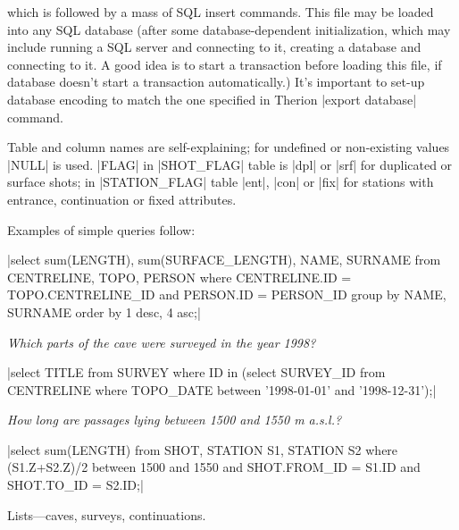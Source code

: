 which is followed by a mass of SQL insert commands. This file may be loaded 
into any SQL database (after some database-dependent initialization, which may 
include running a SQL server and connecting to it, creating a database and 
connecting to it. A good idea is to start a transaction before loading this 
file, if database doesn't start a transaction automatically.) 
It's important to set-up database encoding to match the one 
specified in Therion |export database| command.


\midinsert
    \centerline{}%
\endinsert


Table and column names are self-explaining; for undefined or non-existing 
values |NULL| is used. |FLAG| in |SHOT_FLAG| table is |dpl| or |srf| for duplicated
or surface shots; in |STATION_FLAG| table |ent|, |con| or |fix| for stations
with entrance, continuation or fixed attributes.

Examples of simple queries follow:


|select sum(LENGTH), sum(SURFACE_LENGTH), NAME, SURNAME 
  from CENTRELINE, TOPO, PERSON 
  where CENTRELINE.ID = TOPO.CENTRELINE_ID and PERSON.ID = PERSON_ID 
  group by NAME, SURNAME order by 1 desc, 4 asc;|

{\it Which parts of the cave were surveyed in the year 1998?}

|select TITLE from SURVEY where ID in 
  (select SURVEY_ID from CENTRELINE 
  where TOPO_DATE between '1998-01-01' and '1998-12-31');|

{\it How long are passages lying between 1500 and 1550 m a.s.l.?}

|select sum(LENGTH) from SHOT, STATION S1, STATION S2 
  where (S1.Z+S2.Z)/2 between 1500 and 1550 and 
  SHOT.FROM_ID = S1.ID and SHOT.TO_ID = S2.ID;|

\subsubchapter Lists---caves, surveys, continuations.

